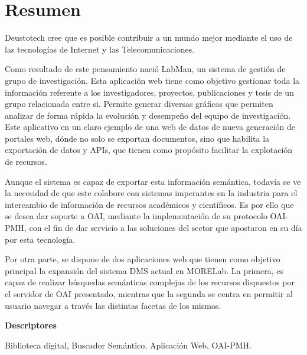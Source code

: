 \chapter*{Resumen}

Deustotech cree que es posible contribuir a un mundo mejor mediante el uso de
las tecnologías de Internet y las Telecomunicaciones.

Como resultado de este pensamiento nació LabMan, un sistema de gestión de grupo
de investigación. Esta aplicación web tiene como objetivo gestionar toda la
información referente a los investigadores, proyectos, publicaciones y tesis de un grupo relacionada entre si. Permite generar diversas gráficas que permiten analizar de forma rápida la evolución y desempeño del equipo de investigación.
Este aplicativo en un claro ejemplo de una web de datos de nueva generación de
portales web, dónde no solo se exportan documentos, sino que habilita la
exportación de datos y APIs, que tienen como propósito facilitar la explotación
de recursos.

Aunque el sistema es capaz de exportar esta información semántica, todavía se ve la necesidad de que este colabore con  sistemas imperantes en la industria para el intercambio de información de recursos académicos y científicos.
Es por ello que se desea dar soporte a OAI, mediante la implementación de su
protocolo OAI-PMH, con el fin de dar servicio a las soluciones del sector que
apostaron en su día por esta tecnología.

Por otra parte, se dispone de dos aplicaciones web que tienen como objetivo
principal la expansión del sistema DMS actual en MORELab. La primera, es capaz
de realizar búsquedas semánticas complejas de los recursos dispuestos por el
servidor de OAI presentado, mientras que la segunda se centra en permitir al
usuario navegar a través las distintas facetas de los mismos.

\vspace{2em}

{\Large\bfseries\sectionfont Descriptores}
\vspace{3\medskipamount}

Biblioteca digital, Buscador Semántico, Aplicación Web, OAI-PMH.